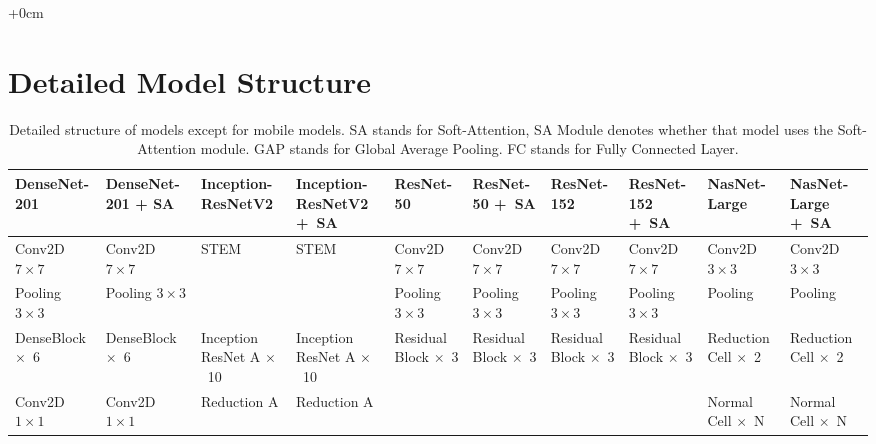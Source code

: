 \documentclass[sensors,article,accept,pdftex,moreauthors]{Definitions/mdpi}
\begin{document}
	
	\appendixstart
	\appendix
\startlandscape

\begin{adjustwidth}{+\extralength}{0cm}
	\section[\appendixname~\thesection]{Detailed Model Structure}
	
	\begin{table}[H]
			\caption{{Detailed structure} %
 of models except for mobile models. SA stands for Soft-Attention, SA Module denotes whether that model uses the Soft-Attention module. GAP stands for Global Average Pooling. FC stands for Fully Connected Layer.\label{appendix-table:detailed structure model}}
\begin{tabularx}{\textwidth}{p{2.2cm}  p{2.2cm}  p{2.2cm}  p{2.6cm}  p{2.2cm}  p{2.2cm}  p{2.2cm}  p{2.2cm}  p{2.4cm}  p{2.6cm}}
	\toprule
	\textbf{DenseNet-201} & \textbf{DenseNet-201 + SA} & \textbf{Inception-ResNetV2} & \textbf{Inception-ResNetV2 +~SA} & \textbf{ResNet-50} & \textbf{ResNet-50 +~SA} & \textbf{ResNet-152} & \textbf{ResNet-152 +~SA} & \textbf{NasNet-Large} & \textbf{NasNet-Large +~SA}\\
	\midrule
	Conv2D $7 \times 7$ & Conv2D $7 \times 7$ & STEM& STEM& Conv2D $7 \times 7$& Conv2D $7 \times 7$& Conv2D $7 \times 7$& Conv2D $7 \times 7$& Conv2D $3 \times 3$& Conv2D $3 \times 3$\\ \midrule
	Pooling $3 \times 3$ & Pooling $3 \times 3$ & & & Pooling $3 \times 3$& Pooling  $3 \times 3$& Pooling  $3 \times 3$& Pooling  $3 \times 3$& Pooling& Pooling\\ \midrule		
	DenseBlock $\times$~6 & DenseBlock $\times$~6 & Inception ResNet A $\times$~10& Inception ResNet A $\times$~10& Residual Block $\times$~3& Residual Block $\times$~3& Residual Block $\times$~3& Residual Block $\times$~3& Reduction Cell $\times$~2& Reduction Cell $\times$~2\\  \midrule
	Conv2D $1 \times 1$ & Conv2D $1 \times 1$ & Reduction A & Reduction A & & & & & Normal Cell $\times$~N& Normal Cell $\times$~N\\	\midrule

\end{tabularx}
\end{table}
\end{adjustwidth}
\end{document}
